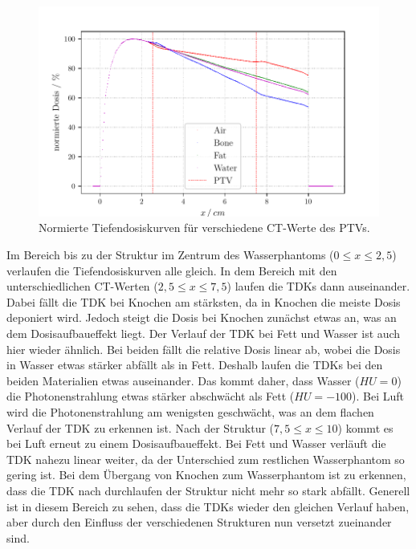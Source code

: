 \begin{figure}[H]
  \centering
  \includegraphics[width=\textwidth]{build/Aufgabe3.2.pdf}
  \caption{Normierte Tiefendosiskurven für verschiedene CT-Werte des PTVs.}
  \label{abb:3.2}
\end{figure}

Im Bereich bis zu der Struktur im Zentrum des Wasserphantoms ($0 \leq x \leq 2,5$) verlaufen
die Tiefendosiskurven alle gleich.
In dem Bereich mit den unterschiedlichen CT-Werten ($2,5 \leq x \leq 7,5$)
laufen die TDKs dann auseinander. Dabei fällt die TDK bei Knochen am stärksten, da in Knochen
die meiste Dosis deponiert wird. Jedoch steigt die Dosis bei Knochen zunächst etwas an, was an dem Dosisaufbaueffekt liegt.
Der Verlauf der TDK bei Fett und Wasser ist auch hier wieder ähnlich. Bei beiden fällt die relative Dosis linear
ab, wobei die Dosis in Wasser etwas stärker abfällt als in Fett. Deshalb laufen die TDKs bei den beiden Materialien etwas auseinander.
Das kommt daher, dass Wasser ($HU = 0$) die Photonenstrahlung etwas stärker abschwächt als Fett ($HU = -100$).
Bei Luft wird die Photonenstrahlung am wenigsten geschwächt, was an dem flachen Verlauf
der TDK zu erkennen ist. Nach der Struktur ($7,5 \leq x \leq 10$) kommt es bei Luft erneut zu
einem Dosisaufbaueffekt. Bei Fett und Wasser verläuft die TDK nahezu linear weiter,
da der Unterschied zum restlichen Wasserphantom so gering ist. Bei dem Übergang von Knochen zum
Wasserphantom ist zu erkennen, dass die TDK nach durchlaufen der Struktur nicht mehr so stark abfällt.
Generell ist in diesem Bereich zu sehen, dass die TDKs wieder den gleichen Verlauf haben, aber durch den Einfluss
der verschiedenen Strukturen nun versetzt zueinander sind.
